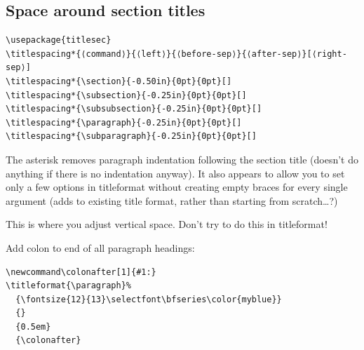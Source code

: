 \documentclass{article}
\begin{document}
\subsection{Space around section titles}
\begin{minipage}[t]{\textwidth}
\begin{lstlisting}
\usepackage{titlesec}
\titlespacing*{⟨command⟩}{⟨left⟩}{⟨before-sep⟩}{⟨after-sep⟩}[⟨right-sep⟩]
\titlespacing*{\section}{-0.50in}{0pt}{0pt}[]
\titlespacing*{\subsection}{-0.25in}{0pt}{0pt}[]
\titlespacing*{\subsubsection}{-0.25in}{0pt}{0pt}[]
\titlespacing*{\paragraph}{-0.25in}{0pt}{0pt}[]
\titlespacing*{\subparagraph}{-0.25in}{0pt}{0pt}[]
\end{lstlisting}
\end{minipage}
\begin{minipage}[t]{\textwidth}
    The asterisk removes paragraph
    indentation following the section title (doesn't do anything if there
    is no indentation anyway). It also appears to allow you to set only a few options
    in titleformat without creating empty braces for every single argument
    (adds to existing title format, rather than starting from scratch\ldots?)

    This is where you adjust vertical space. Don't try to do this in titleformat!
\end{minipage}

Add colon to end of all paragraph headings:
\begin{lstlisting}
\newcommand\colonafter[1]{#1:}
\titleformat{\paragraph}%
  {\fontsize{12}{13}\selectfont\bfseries\color{myblue}}
  {}
  {0.5em}
  {\colonafter}
\end{lstlisting}
\end{document}
